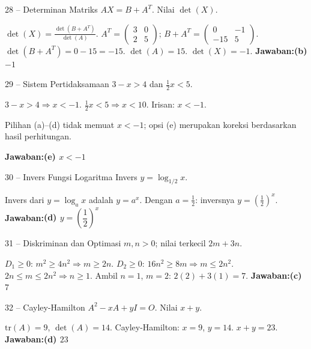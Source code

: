 \documentclass[11pt]{article}
\newcommand{\jawaban}[1]{\textbf{Jawaban:}\enspace\colorbox{gold!30}{\textbf{#1}}}
\begin{document}
\begin{soal}{28 -- Determinan Matriks}
$AX=B+A^T$. Nilai $\det(X)$.
\end{soal}
\begin{pembox}
$\det(X)=\frac{\det(B+A^T)}{\det(A)}$. $A^T=\begin{pmatrix}3&0\\2&5\end{pmatrix}$; $B+A^T=\begin{pmatrix}0&-1\\-15&5\end{pmatrix}$.
$\det(B+A^T)=0-15=-15$. $\det(A)=15$. $\det(X)=-1$.
\jawaban{(b) $-1$}
\end{pembox}

\begin{soal}{29 -- Sistem Pertidaksamaan}
$3-x>4$ dan $\frac12x<5$.
\end{soal}
\begin{pembox}
$3-x>4\Rightarrow x<-1$. $\frac12x<5\Rightarrow x<10$. Irisan: $x<-1$.
\begin{catatan}
Pilihan (a)--(d) tidak memuat $x<-1$; opsi (e) merupakan koreksi berdasarkan hasil perhitungan.
\end{catatan}
\jawaban{(e) $x<-1$}
\end{pembox}

\begin{soal}{30 -- Invers Fungsi Logaritma}
Invers $y=\log_{1/2}x$.
\end{soal}
\begin{pembox}
Invers dari $y=\log_a x$ adalah $y=a^x$. Dengan $a=\frac12$: inversnya $y=\left(\frac12\right)^x$.
\jawaban{(d) $y=\left(\dfrac12\right)^x$}
\end{pembox}

\begin{soal}{31 -- Diskriminan dan Optimasi}
$m,n>0$; nilai terkecil $2m+3n$.
\end{soal}
\begin{pembox}
$D_1\geq0$: $m^2\geq4n^2\Rightarrow m\geq2n$.
$D_2\geq0$: $16n^2\geq8m\Rightarrow m\leq2n^2$.
$2n\leq m\leq2n^2\Rightarrow n\geq1$. Ambil $n=1$, $m=2$: $2(2)+3(1)=7$.
\jawaban{(c) $7$}
\end{pembox}

\begin{soal}{32 -- Cayley-Hamilton}
$A^2-xA+yI=O$. Nilai $x+y$.
\end{soal}
\begin{pembox}
$\mathrm{tr}(A)=9$, $\det(A)=14$. Cayley-Hamilton: $x=9$, $y=14$. $x+y=23$.
\jawaban{(d) $23$}
\end{pembox}
\end{document}
